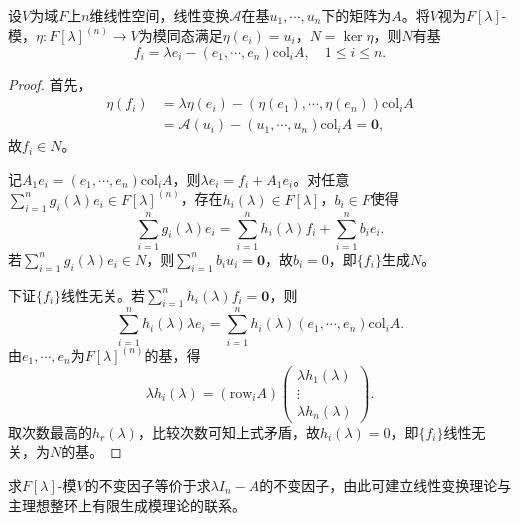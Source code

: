 \documentclass[../../main.tex]{subfiles}%
\begin{document}
\begin{theorem}
设$V$为域$F$上$n$维线性空间，线性变换$\mathscr{A}$在基$u_1,\cdots,u_n$下的矩阵为$A$。将$V$视为$F[\lambda]$-模，$\eta\colon F[\lambda]^{(n)}\to V$为模同态满足$\eta(e_i)=u_i$，$N=\ker\eta$，则$N$有基
$$f_i=\lambda e_i-(e_1,\cdots,e_n)\mathrm{col}_iA,\quad 1\leqslant i\leqslant n.$$
\end{theorem}

\begin{proof}
首先，
\begin{align*}
\eta(f_i)&=\lambda\eta(e_i)-(\eta(e_1),\cdots,\eta(e_n))\mathrm{col}_iA\\
&=\mathscr{A}(u_i)-(u_1,\cdots,u_n)\mathrm{col}_iA=\boldsymbol{0},
\end{align*}
故$f_i\in N$。

记$A_1e_i=(e_1,\cdots,e_n)\mathrm{col}_iA$，则$\lambda e_i=f_i+A_1e_i$。对任意$\sum_{i=1}^ng_i(\lambda)e_i\in F[\lambda]^{(n)}$，存在$h_i(\lambda)\in F[\lambda]$，$b_i\in F$使得
$$\sum_{i=1}^ng_i(\lambda)e_i=\sum_{i=1}^nh_i(\lambda)f_i+\sum_{i=1}^nb_ie_i.$$
若$\sum_{i=1}^ng_i(\lambda)e_i\in N$，则$\sum_{i=1}^nb_iu_i=\boldsymbol{0}$，故$b_i=0$，即$\{f_i\}$生成$N$。

下证$\{f_i\}$线性无关。若$\sum_{i=1}^nh_i(\lambda)f_i=\boldsymbol{0}$，则
$$\sum_{i=1}^nh_i(\lambda)\lambda e_i=\sum_{i=1}^nh_i(\lambda)(e_1,\cdots,e_n)\mathrm{col}_iA.$$
由$e_1,\cdots,e_n$为$F[\lambda]^{(n)}$的基，得
$$\lambda h_i(\lambda)=(\mathrm{row}_iA)\begin{pmatrix}\lambda h_1(\lambda)\\\vdots\\\lambda h_n(\lambda)\end{pmatrix}.$$
取次数最高的$h_r(\lambda)$，比较次数可知上式矛盾，故$h_i(\lambda)=0$，即$\{f_i\}$线性无关，为$N$的基。
\end{proof}

\begin{remark}
求$F[\lambda]$-模$V$的不变因子等价于求$\lambda I_n-A$的不变因子，由此可建立线性变换理论与主理想整环上有限生成模理论的联系。
\end{remark}
\end{document}
